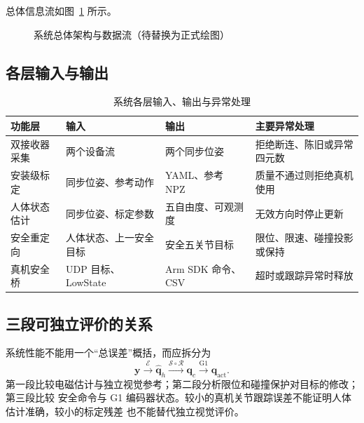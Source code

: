 总体信息流如图~\ref{fig:ch3_system_architecture} 所示。
\begin{figure}[htbp]
  \centering
  \caption{系统总体架构与数据流（待替换为正式绘图）}
  \label{fig:ch3_system_architecture}
\end{figure}

\subsection{各层输入与输出}
\label{subsec:ch3_layer_interfaces}

\begin{table}[htbp]
  \centering
  \caption{系统各层输入、输出与异常处理}
  \label{tab:ch3_layer_interfaces}
  \begin{tabularx}{\linewidth}{@{}lXXX@{}}
    \toprule
    功能层 & 输入 & 输出 & 主要异常处理 \\
    \midrule
    双接收器采集 & 两个设备流 & 两个同步位姿 & 拒绝断连、陈旧或异常四元数 \\
    安装级标定 & 同步位姿、参考动作 & YAML、参考 NPZ & 质量不通过则拒绝真机使用 \\
    人体状态估计 & 同步位姿、标定参数 & 五自由度、可观测度 & 无效方向时停止更新 \\
    安全重定向 & 人体状态、上一安全目标 & 安全五关节目标 & 限位、限速、碰撞投影或保持 \\
    真机安全桥 & UDP 目标、LowState & Arm SDK 命令、CSV & 超时或跟踪异常时释放 \\
    \bottomrule
  \end{tabularx}
\end{table}

\subsection{三段可独立评价的关系}
\label{subsec:ch3_three_evaluation_stages}

系统性能不能用一个“总误差”概括，而应拆分为
\begin{equation}
  \boldsymbol y\xrightarrow{\mathcal E}\hat{\boldsymbol q}_h
  \xrightarrow{\mathcal S\circ\mathcal R}\boldsymbol q_c
  \xrightarrow{\mathrm{G1}}\boldsymbol q_{\mathrm{act}}.
  \label{eq:ch3_information_pipeline}
\end{equation}
第一段比较电磁估计与独立视觉参考；第二段分析限位和碰撞保护对目标的修改；第三段比较
安全命令与 G1 编码器状态。较小的真机关节跟踪误差不能证明人体估计准确，较小的标定残差
也不能替代独立视觉评价。

